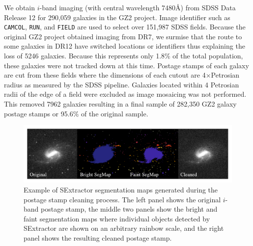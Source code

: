 We obtain $i$-band imaging (with central wavelength 7480\AA) from SDSS Data Release 12 for 290,059 galaxies in the GZ2 project. Image identifier such as \texttt{CAMCOL}, \texttt{RUN}, and \texttt{FIELD} are used to select over 151,987 SDSS fields. Because the original GZ2 project obtained imaging from DR7, we surmise that the route to some galaxies in DR12 have switched locations or identifiers thus explaining the loss of 5246 galaxies. Because this represents only 1.8\% of the total population, these galaxies were not tracked down at this time. Postage stamps of each galaxy are cut from these fields where the dimensions of each cutout are 4$\times$Petrosian radius as measured by the SDSS pipeline. Galaxies located within 4 Petrosian radii of the edge of a field were excluded as image mosaicing was not performed. This removed 7962 galaxies resulting in a final sample of 282,350 GZ2 galaxy postage stamps or 95.6\% of the original sample.

\begin{figure}
\includegraphics[width=\textwidth]{Figures/sextractor_example.pdf}
\caption[Example of Source Extractor segmentation maps.]{Example of SExtractor segmentation maps generated during the postage stamp cleaning process. The left panel shows the original $i$-band postage stamp, the middle two panels show the bright and faint segmentation maps where individual objects detected by SExtractor are shown on an arbitrary rainbow scale, and the right panel shows the resulting cleaned postage stamp.}
\label{fig: segmaps}
\end{figure}



